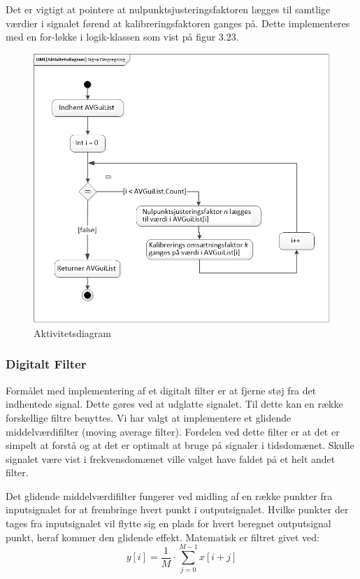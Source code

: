 Det er vigtigt at pointere at nulpunktsjusteringsfaktoren lægges til samtlige værdier i signalet førend at kalibreringsfaktoren ganges på. Dette implementeres med en for-løkke i logik-klassen som vist på figur 3.23.
\begin{figure}[H]
	\centering
	\includegraphics[width=1.0\textwidth]{Figurer/AktKaliNul}
	\caption{Aktivitetsdiagram}
\end{figure}

\subsubsection{Digitalt Filter}
Formålet med implementering af et digitalt filter er at fjerne støj fra det indhentede signal. Dette gøres ved at udglatte signalet. Til dette kan en række forskellige filtre benyttes. Vi har valgt at implementere et glidende middelværdifilter (moving average filter). Fordelen ved dette filter er at det er simpelt at forstå og at det er optimalt at bruge på signaler i tidsdomænet. Skulle signalet være vist i frekvensdomænet ville valget have faldet på et helt andet filter. 

Det glidende middelværdifilter fungerer ved midling af en række punkter fra inputsignalet for at frembringe hvert punkt i outputsignalet. Hvilke punkter der tages fra inputsignalet vil flytte sig en plads for hvert beregnet outputsignal punkt, heraf kommer den glidende effekt. Matematisk er filtret givet ved:
\begin{equation}
y[i]=\frac{1}{M}\cdot\sum\limits_{j=0}^{M-1} x[i+j]
\end{equation}


